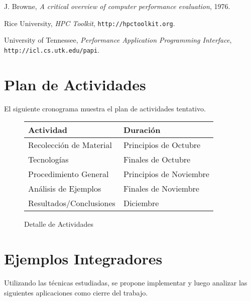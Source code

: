 \documentclass[a4paper]{article}
\begin{document}
\begin{thebibliography}{9}
 J. Browne,
 \emph{A critical overview of computer performance evaluation},
 1976.

  Rice University,
 \emph{HPC Toolkit},
 {\tt http://hpctoolkit.org}.

  University of Tennessee,
  \emph{Performance Application Programming Interface},
  {\tt http://icl.cs.utk.edu/papi}.


\end{thebibliography}

\section{Plan de Actividades}

El siguiente cronograma muestra el plan de actividades tentativo.

\begin{figure}[H]
  \begin{center}
    \begin{tabular}{|l|l|}\hline
      {\bf Actividad} & {\bf Duraci\'on} \\ \hline
      Recolecci\'on de Material & Principios de Octubre \\ \hline
      Tecnolog\'ias & Finales de Octubre \\ \hline
      Procedimiento General & Principios de Noviembre \\ \hline
      An\'alisis de Ejemplos & Finales de Noviembre \\ \hline
      Resultados/Conclusiones & Diciembre \\ \hline
    \end{tabular}
    \caption{Detalle de Actividades}
  \end{center}
  \label{schedule}
\end{figure}

\appendix

\section{Ejemplos Integradores}

Utilizando las t\'ecnicas estudiadas, se propone implementar y luego analizar
las siguientes aplicaciones como cierre del trabajo.
\end{document}
